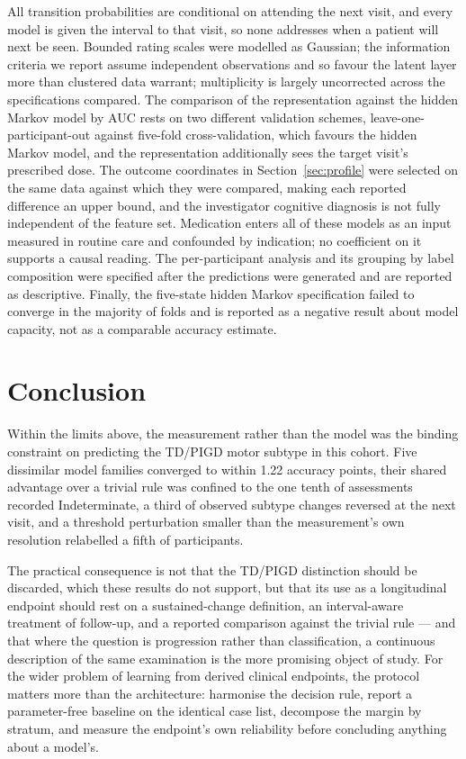 \documentclass[journal]{IEEEtran}
\begin{document}
All transition probabilities are conditional on attending the next visit, and
every model is given the interval to that visit, so none addresses when a
patient will next be seen. Bounded rating scales were modelled as Gaussian; the
information criteria we report assume independent observations and so favour the
latent layer more than clustered data warrant; multiplicity is largely
uncorrected across the specifications compared. The comparison of the
representation against the hidden Markov model by AUC rests on two different
validation schemes, leave-one-participant-out against five-fold
cross-validation, which favours the hidden Markov model, and the representation
additionally sees the target visit's prescribed dose. The outcome coordinates in
Section~\ref{sec:profile} were selected on the same data against which they were
compared, making each reported difference an upper bound, and the investigator
cognitive diagnosis is not fully independent of the feature set. Medication
enters all of these models as an input measured in routine care and confounded
by indication; no coefficient on it supports a causal reading. The
per-participant analysis and its grouping by label composition were specified
after the predictions were generated and are reported as descriptive. Finally,
the five-state hidden Markov specification failed to converge in the majority of
folds and is reported as a negative result about model capacity, not as a
comparable accuracy estimate.

\section{Conclusion}

Within the limits above, the measurement rather than the model was the binding
constraint on predicting the TD/PIGD motor subtype in this cohort. Five
dissimilar model families converged to within 1.22 accuracy points, their shared
advantage over a trivial rule was confined to the one tenth of assessments
recorded Indeterminate, a third of observed subtype changes reversed at the next
visit, and a threshold perturbation smaller than the measurement's own
resolution relabelled a fifth of participants.

The practical consequence is not that the TD/PIGD distinction should be
discarded, which these results do not support, but that its use as a
longitudinal endpoint should rest on a sustained-change definition, an
interval-aware treatment of follow-up, and a reported comparison against the
trivial rule --- and that where the question is progression rather than
classification, a continuous description of the same examination is the more
promising object of study. For the wider problem of learning from derived
clinical endpoints, the protocol matters more than the architecture:
harmonise the decision rule, report a parameter-free baseline on the identical
case list, decompose the margin by stratum, and measure the endpoint's own
reliability before concluding anything about a model's.
\end{document}
